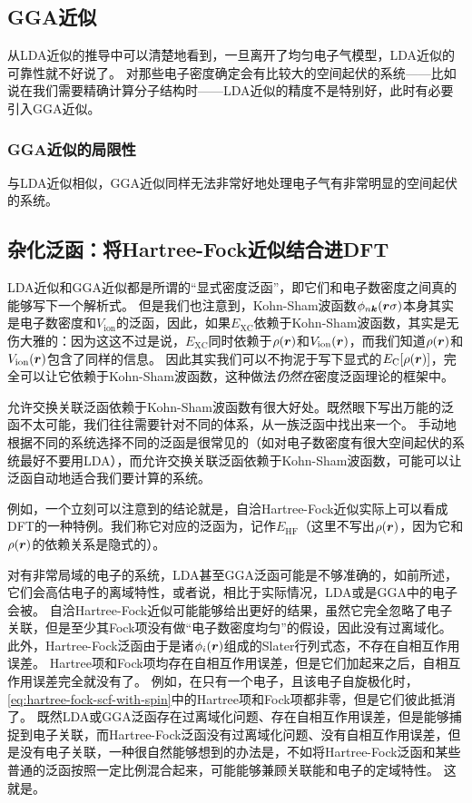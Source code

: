 \subsection{GGA近似}

从LDA近似的推导中可以清楚地看到，一旦离开了均匀电子气模型，LDA近似的可靠性就不好说了。
对那些电子密度确定会有比较大的空间起伏的系统——比如说在我们需要精确计算分子结构时——LDA近似的精度不是特别好，此时有必要引入GGA近似。

\subsubsection{GGA近似的局限性}

与LDA近似相似，GGA近似同样无法非常好地处理电子气有非常明显的空间起伏的系统。

\subsection{杂化泛函：将Hartree-Fock近似结合进DFT}

LDA近似和GGA近似都是所谓的“显式密度泛函”，即它们和电子数密度之间真的能够写下一个解析式。
但是我们也注意到，Kohn-Sham波函数$\phi_{n \vb*{k}}(\vb*{r} \sigma)$本身其实是电子数密度和$V_\text{ion}$的泛函，因此，如果$E_\text{XC}$依赖于Kohn-Sham波函数，其实是无伤大雅的：因为这这不过是说，$E_\text{XC}$同时依赖于$\rho(\vb*{r})$和$V_\text{ion}(\vb*{r})$，而我们知道$\rho(\vb*{r})$和$V_\text{ion}(\vb*{r})$包含了同样的信息。
因此其实我们可以不拘泥于写下显式的$E_\text{C}[\rho(\vb*{r})]$，完全可以让它依赖于Kohn-Sham波函数，这种做法\emph{仍然在}密度泛函理论的框架中。

允许交换关联泛函依赖于Kohn-Sham波函数有很大好处。既然眼下写出万能的泛函不太可能，我们往往需要针对不同的体系，从一族泛函中找出来一个。
手动地根据不同的系统选择不同的泛函是很常见的（如对电子数密度有很大空间起伏的系统最好不要用LDA），而允许交换关联泛函依赖于Kohn-Sham波函数，可能可以让泛函自动地适合我们要计算的系统。

例如，一个立刻可以注意到的结论就是，自洽Hartree-Fock近似实际上可以看成DFT的一种特例。我们称它对应的泛函为，记作$E_\text{HF}$（这里不写出$\rho(\vb*{r})$，因为它和$\rho(\vb*{r})$的依赖关系是隐式的）。

对有非常局域的电子的系统，LDA甚至GGA泛函可能是不够准确的，如前所述，它们会高估电子的离域特性，或者说，相比于实际情况，LDA或是GGA中的电子会被。
自洽Hartree-Fock近似可能能够给出更好的结果，虽然它完全忽略了电子关联，但是至少其Fock项没有做“电子数密度均匀”的假设，因此没有过离域化。
此外，Hartree-Fock泛函由于是诸$\phi_i(\vb*{r})$组成的Slater行列式态，不存在自相互作用误差。
Hartree项和Fock项均存在自相互作用误差，但是它们加起来之后，自相互作用误差完全就没有了。
例如，在只有一个电子，且该电子自旋极化时，\eqref{eq:hartree-fock-scf-with-spin}中的Hartree项和Fock项都非零，但是它们彼此抵消了。
既然LDA或GGA泛函存在过离域化问题、存在自相互作用误差，但是能够捕捉到电子关联，而Hartree-Fock泛函没有过离域化问题、没有自相互作用误差，但是没有电子关联，一种很自然能够想到的办法是，不如将Hartree-Fock泛函和某些普通的泛函按照一定比例混合起来，可能能够兼顾关联能和电子的定域特性。
这就是。

